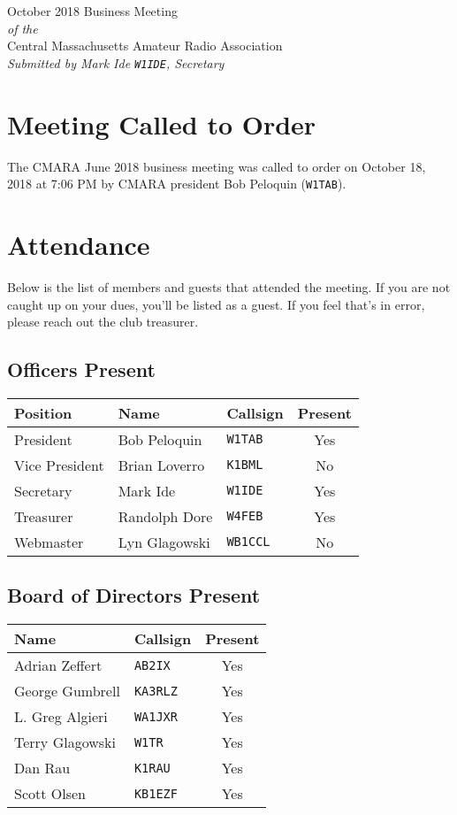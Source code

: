 \documentclass[10pt,letterpaper]{article}
\begin{document}
\begin{center}
{\huge October 2018 Business Meeting}\\
\emph{of the}\\
{\Large Central Massachusetts Amateur Radio Association}\\
\emph{Submitted by Mark Ide \texttt{W1IDE}, Secretary}
\end{center}

\section{Meeting Called to Order}
The CMARA June 2018 business meeting was called to order on October 18, 2018 at 7:06 PM by CMARA president Bob Peloquin (\texttt{W1TAB}).

\section{Attendance}
\noindent
Below is the list of members and guests that attended the meeting. If you are not caught up on your dues, you'll be listed as a guest. If you feel that's in error, please reach out the club treasurer.

\subsection{Officers Present}
\begin{tabular}{|l|l|l|c|}
  \hline
  \textbf{Position} & \textbf{Name}  & \textbf{Callsign} & \textbf{Present} \\ \hline
  President         & Bob Peloquin   & \texttt{W1TAB}    & Yes \\
  Vice President    & Brian Loverro  & \texttt{K1BML}    & No  \\
  Secretary         & Mark Ide       & \texttt{W1IDE}    & Yes \\
  Treasurer         & Randolph Dore  & \texttt{W4FEB}    & Yes \\
  Webmaster         & Lyn Glagowski  & \texttt{WB1CCL}   & No  \\
  \hline
\end{tabular}

\subsection{Board of Directors Present}
\begin{tabular}{|l|l|c|}
  \hline
  \textbf{Name}     & \textbf{Callsign} & \textbf{Present} \\ \hline
  Adrian Zeffert  & \texttt{AB2IX}    & Yes \\
  George Gumbrell & \texttt{KA3RLZ}   & Yes \\
  L. Greg Algieri & \texttt{WA1JXR}   & Yes \\
  Terry Glagowski & \texttt{W1TR}     & Yes \\
  Dan Rau         & \texttt{K1RAU}    & Yes \\
  Scott Olsen     & \texttt{KB1EZF}   & Yes \\
  \hline
\end{tabular}
\end{document}
